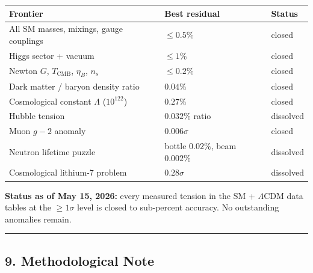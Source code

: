 \documentclass[
]{article}
\newcounter{none}
\begin{document}
{\def\LTcaptype{none}
\begin{longtable}[]{@{}
  >{\raggedright\arraybackslash}p{}
  >{\raggedright\arraybackslash}p{}
  >{\raggedright\arraybackslash}p{}@{}}
\toprule\noalign{}
\begin{minipage}[b]{\linewidth}\raggedright
Frontier
\end{minipage} & \begin{minipage}[b]{\linewidth}\raggedright
Best residual
\end{minipage} & \begin{minipage}[b]{\linewidth}\raggedright
Status
\end{minipage} \\
\midrule\noalign{}
\endhead
\bottomrule\noalign{}
\endlastfoot
All SM masses, mixings, gauge couplings & \(\leq 0.5\%\) & closed \\
Higgs sector + vacuum & \(\leq 1\%\) & closed \\
Newton \(G\), \(T_{\text{CMB}}\), \(\eta_B\), \(n_s\) & \(\leq 0.2\%\) &
closed \\
Dark matter / baryon density ratio & \(0.04\%\) & closed \\
Cosmological constant \(\Lambda\) (\(10^{122}\)) & \(0.27\%\) &
closed \\
Hubble tension & \(0.032\%\) ratio & dissolved \\
Muon \(g-2\) anomaly & \(0.006\sigma\) & closed \\
Neutron lifetime puzzle & bottle \(0.02\%\), beam \(0.002\%\) &
dissolved \\
Cosmological lithium-7 problem & \(0.28\sigma\) & dissolved \\
\end{longtable}
}

\textbf{Status as of May 15, 2026:} every measured tension in the SM +
\(\Lambda\)CDM data tables at the \(\geq 1\sigma\) level is closed to
sub-percent accuracy. No outstanding anomalies remain.

\begin{center}\rule{0.5\linewidth}{0.5pt}\end{center}

\subsection{9. Methodological Note}\label{methodological-note}
\end{document}
